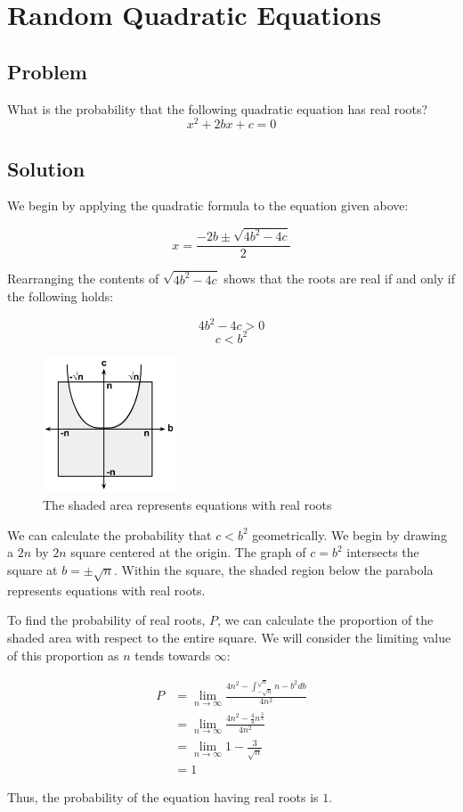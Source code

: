 \documentclass{article}
\date{}
\author{Kaan Aksoy | March 12, 2020}
\begin{document}
\maketitle
\section{Random Quadratic Equations}

\subsection{Problem}

What is the probability that the following quadratic 
equation has real roots?
$$x^2 + 2bx + c =0$$

\subsection{Solution}

We begin by applying the quadratic formula to the 
equation given above:

$$x = \frac{-2b \pm \sqrt{4b^2-4c}}{2}$$

Rearranging the contents of $\sqrt{4b^2-4c}$ shows that 
the roots are real if and only if the following holds:

$$4b^2-4c > 0$$
$$c < b^2$$

\begin{figure}[h]
\centering
\includegraphics[width=4cm]{Problem50_RandomQuadraticEquation.png}
\caption{The shaded area represents equations with real roots}
\end{figure}


We can calculate the probability that $c < b^2$ geometrically. 
We begin by drawing a $2n$ by $2n$ square centered at the origin. 
The graph of $c=b^2$ intersects the square at $b=\pm \sqrt{n}$. 
Within the square, the shaded region below the parabola 
represents equations with real roots. 

To find the probability of real roots, $P$, we can calculate the  
proportion of the shaded area with respect to the entire square. 
We will consider the limiting value of this proportion as $n$ tends 
towards $\infty$:

\begin{equation*}
\begin{split}
P &= \lim_{n \to \infty} \frac{4n^2 - \int_{-\sqrt{n}}^{\sqrt{n}}n-b^2db}{4n^2} \\
&= \lim_{n \to \infty} \frac{4n^2 - \frac{4}{3}n^{\frac{3}{2}}}{4n^2} \\
&= \lim_{n \to \infty} 1 - \frac{3}{\sqrt{n}} \\
&= 1
\end{split}
\end{equation*}

Thus, the probability of the equation having real roots is $1$.
\end{document}
